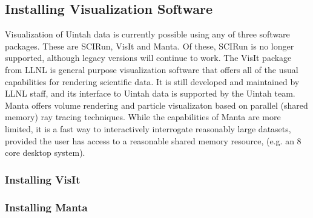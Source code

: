 \subsection{Installing Visualization Software}

Visualization of Uintah data is currently possible using any of three
software packages.  These are SCIRun, VisIt and Manta.  Of these, SCIRun is
no longer supported, although legacy versions will continue to work.  The
VisIt package from LLNL is general purpose visualization software that offers
all of the usual capabilities for rendering scientific data.  It is still
developed and maintained by LLNL staff, and its interface to Uintah data is
supported by the Uintah team.  Manta offers volume rendering and particle
visualizaton based on parallel (shared memory) ray tracing techniques.
While the capabilities of Manta are more limited, it is a fast way to
interactively interrogate reasonably large datasets, provided the user has
access to a reasonable shared memory resource, (e.g. an 8 core desktop system).

\subsubsection{Installing VisIt}

\subsubsection{Installing Manta}


